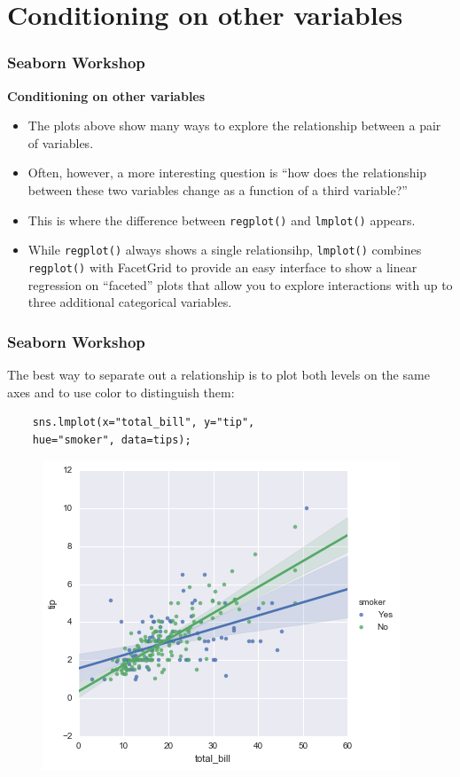 \documentclass{beamer}
\begin{document}
\section{Conditioning on other variables}
\begin{frame}
	\frametitle{Seaborn Workshop}
	\large
	\textbf{Conditioning on other variables}
	\begin{itemize}
		\item The plots above show many ways to explore the relationship between a pair of variables.
		\item Often, however, a more interesting question is “how does the relationship between these two variables change as a function of a third variable?” 
		\item This is where the difference between \texttt{regplot()} and \texttt{lmplot()} appears. 
		\item While \texttt{regplot()} always shows a single relationsihp, \texttt{lmplot()} combines \texttt{regplot()} with FacetGrid to provide an easy interface to show a linear regression on “faceted” plots that allow you to explore interactions with up to three additional categorical variables.
	\end{itemize}
	
\end{frame}
\begin{frame}[fragile]
	\frametitle{Seaborn Workshop}
	\large
	
	The best way to separate out a relationship is to plot both levels on the same axes and to use color to distinguish them:
	\begin{verbatim}
	sns.lmplot(x="total_bill", y="tip", 
	hue="smoker", data=tips);
	\end{verbatim}
	
	\begin{figure}
		\centering
		\includegraphics[width=0.55\linewidth]{images/regression_39_0}
	\end{figure}
\end{frame}
\end{document}
